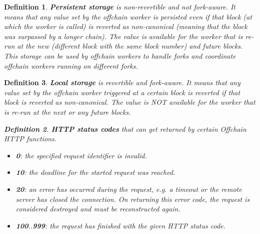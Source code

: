 \documentclass{book}
\newcommand{\tmstrong}[1]{\textbf{#1}}
\newcommand{\tmtextbf}[1]{{\bfseries{#1}}}
\newcommand{\tmtexttt}[1]{{\ttfamily{#1}}}
\newcommand{\tmverbatim}[1]{{\ttfamily{#1}}}
\newenvironment{itemizedot}{\begin{itemize} \renewcommand{\labelitemi}{$\bullet$}\renewcommand{\labelitemii}{$\bullet$}\renewcommand{\labelitemiii}{$\bullet$}\renewcommand{\labelitemiv}{$\bullet$}}{\end{itemize}}
\newtheorem{definition}{Definition}
\providecommand{\tmstrong}[1]{\tmtextbf{#1}}
\providecommand{\tmtextbf}[1]{\tmtextbf{#1}}
\providecommand{\tmverbatim}[1]{\tmtexttt{#1}}
\newtheorem{definition}{Definition}
\begin{document}
\begin{definition}
  \label{defn-offchain-persistent-storage}{\tmstrong{Persistent
  {\tmstrong{storage}}}} is non-revertible and not fork-aware. It means that
  any value set by the offchain worker is persisted even if that block (at
  which the worker is called) is reverted as non-canonical (meaning that the
  block was surpassed by a longer chain). The value is available for the
  worker that is re-run at the new (different block with the same block
  number) and future blocks. This storage can be used by offchain workers to
  handle forks and coordinate offchain workers running on different forks.
\end{definition}

\begin{definition}
  \label{defn-offchain-local-storage}{\tmstrong{Local storage}} is revertible
  and fork-aware. It means that any value set by the offchain worker triggered
  at a certain block is reverted if that block is reverted as non-canonical.
  The value is NOT available for the worker that is re-run at the next or any
  future blocks.
  
  \begin{definition}
    \label{defn-http-return-value}{\tmstrong{HTTP status codes}} that can get
    returned by certain Offchain HTTP functions.
    \begin{itemizedot}
      \item {\tmstrong{0}}: the specified request identifier is invalid.
      
      \item {\tmstrong{10}}: the deadline for the started request was reached.
      
      \item {\tmstrong{20}}: an error has occurred during the request, e.g. a
      timeout or the remote server has closed the connection. On returning
      this error code, the request is considered destroyed and must be
      reconstructed again.
      
      \item {\tmstrong{100}}..{\tmstrong{999}}: the request has finished with
      the given HTTP status code.
    \end{itemizedot}
  \end{definition}
  
  \ 
\end{definition}

\subsubsection{\tmverbatim{ext\_is\_validator}}
\end{document}
